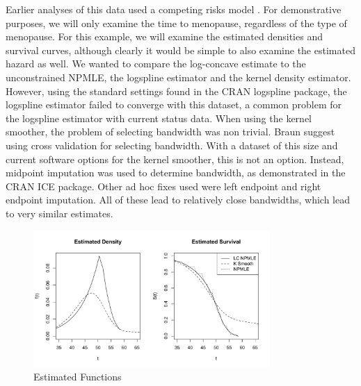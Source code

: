 	Earlier analyses of this data used a competing risks model \cite{J2003}. For demonstrative purposes, we will only examine the time to menopause, regardless of the type of menopause. For this example, we will examine the estimated densities and survival curves, although clearly it would be simple to also examine the estimated hazard as well. We wanted to compare the log-concave estimate to the unconstrained NPMLE, the logspline estimator and the kernel density estimator. However, using the standard settings found in the CRAN logspline package, the logspline estimator failed to converge with this dataset, a common problem for the logspline estimator with current status data. When using the kernel smoother, the problem of selecting bandwidth was non trivial. Braun \cite{RefBea2005} suggest using cross validation for selecting bandwidth. With a dataset of this size and current software options for the kernel smoother, this is not an option. Instead, midpoint imputation was used to determine bandwidth, as demonstrated in the CRAN ICE package. Other ad hoc fixes used were left endpoint and right endpoint imputation. All of these lead to relatively close bandwidths, which lead to very similar estimates. 
		
\begin{figure}[h]
\centerline{\includegraphics[width = 9cm]{MenoPlot.pdf}}
\caption{Estimated Functions}
\end{figure}		
	
